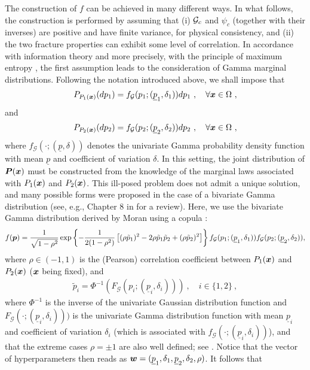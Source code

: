 The construction of $f$ can be achieved in many different ways. In what follows, the construction is performed by assuming that (i) ${\mathcal{G}_c}$ and $\psi_c$ (together with their inverses) are positive and have finite variance, for physical consistency, and (ii) the two fracture properties can exhibit some level of correlation. In accordance with information theory \cite{Jaynes1957a,Jaynes1957b} and more precisely, with the principle of maximum entropy \cite{Shannon1948a,Shannon1948b}, the first assumption leads to the consideration of Gamma marginal distributions. Following the notation introduced above, we shall impose that
\begin{align}
  P_{P_1(\boldsymbol{x})}(dp_1) = f_\mathcal{G}(p_1; (\underline{p}_1,\delta_{1}))dp_1~, \quad \forall \boldsymbol{x} \in \Omega~,
\end{align}
and
\begin{align}
  P_{P_2(\boldsymbol{x})}(dp_2) = f_\mathcal{G}(p_2; (\underline{p}_2,\delta_{2}))dp_2~, \quad \forall \boldsymbol{x} \in \Omega~,
\end{align}
where $f_\mathcal{G}(\cdot; (\underline{p}, \delta))$ denotes the univariate Gamma probability density function with mean $\underline{p}$ and coefficient of variation $\delta$. In this setting, the joint distribution of $\boldsymbol{P}(\boldsymbol{x})$ must be constructed from the knowledge of the marginal laws associated with $P_1(\boldsymbol{x})$ and $P_2(\boldsymbol{x})$. This ill-posed problem does not admit a unique solution, and many possible forms were proposed in the case of a bivariate Gamma distribution (see, e.g., Chapter 8 in \cite{Balakrishnan2009} for a review). Here, we use the bivariate Gamma distribution derived by Moran using a copula \cite{Moran1969}:
\begin{align}
  f(\boldsymbol{p}) = \frac{1}{\sqrt{1-\rho^2}}\exp\left\{-\frac{1}{2(1-\rho^2)}\left[(\rho \tilde{p}_1)^2-2\rho \tilde{p}_1\tilde{p}_2+(\rho \tilde{p}_2)^2\right]\right\} f_\mathcal{G}(p_1; (\underline{p}_1,\delta_{1})) f_\mathcal{G}(p_2; (\underline{p}_2,\delta_{2})),
\end{align}
where $\rho \in (-1,1)$ is the (Pearson) correlation coefficient between $P_1(\boldsymbol{x})$ and $P_2(\boldsymbol{x})$ ($\boldsymbol{x}$ being fixed), and
\begin{align}
  \tilde{p}_i = \Phi^{-1}(F_\mathcal{G}(p_i; (\underline{p}_i,\delta_{i})))~, \quad i\in\{1,2\}~,
\end{align}
where $\Phi^{-1}$ is the inverse of the univariate Gaussian distribution function and $F_\mathcal{G}(\cdot; (\underline{p}_i,\delta_{i})))$ is the univariate Gamma distribution function with mean $\underline{p}_i$ and coefficient of variation $\delta_i$ (which is associated with $f_\mathcal{G}(\cdot; (\underline{p}_i, \delta_i))$), and that the extreme cases $\rho = \pm 1$ are also well defined; see \cite{Moran1969}. Notice that the vector of hyperparameters then reads as $\boldsymbol{w} = (\underline{p}_1,\delta_{1},\underline{p}_2,\delta_{2},\rho)$. It follows that
